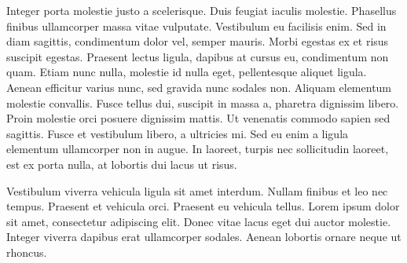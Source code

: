 \documentclass[runningheads]{llncs}
\begin{document}
Integer porta molestie justo a scelerisque. Duis feugiat iaculis molestie. Phasellus finibus ullamcorper massa vitae vulputate. Vestibulum eu facilisis enim. Sed in diam sagittis, condimentum dolor vel, semper mauris. Morbi egestas ex et risus suscipit egestas. Praesent lectus ligula, dapibus at cursus eu, condimentum non quam. Etiam nunc nulla, molestie id nulla eget, pellentesque aliquet ligula. Aenean efficitur varius nunc, sed gravida nunc sodales non. Aliquam elementum molestie convallis. Fusce tellus dui, suscipit in massa a, pharetra dignissim libero. Proin molestie orci posuere dignissim mattis. Ut venenatis commodo sapien sed sagittis. Fusce et vestibulum libero, a ultricies mi. Sed eu enim a ligula elementum ullamcorper non in augue. In laoreet, turpis nec sollicitudin laoreet, est ex porta nulla, at lobortis dui lacus ut risus.

Vestibulum viverra vehicula ligula sit amet interdum. Nullam finibus et leo nec tempus. Praesent et vehicula orci. Praesent eu vehicula tellus. Lorem ipsum dolor sit amet, consectetur adipiscing elit. Donec vitae lacus eget dui auctor molestie. Integer viverra dapibus erat ullamcorper sodales. Aenean lobortis ornare neque ut rhoncus.

	
	
\end{document}
